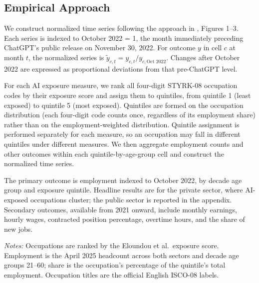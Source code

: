 \subsection{Empirical Approach}\label{sec:data:approach}

We construct normalized time series following the approach in \citet{brynjolfsson2025}, Figures 1--3. Each series is indexed to October 2022 = 1, the month immediately preceding ChatGPT's public release on November 30, 2022. For outcome $y$ in cell $c$ at month $t$, the normalized series is $\tilde{y}_{c,t} = y_{c,t} / y_{c,\text{Oct } 2022}$. Changes after October 2022 are expressed as proportional deviations from that pre-ChatGPT level.

For each AI exposure measure, we rank all four-digit STYRK-08 occupation codes by their exposure score and assign them to quintiles, from quintile 1 (least exposed) to quintile 5 (most exposed). Quintiles are formed on the occupation distribution (each four-digit code counts once, regardless of its employment share) rather than on the employment-weighted distribution. Quintile assignment is performed separately for each measure, so an occupation may fall in different quintiles under different measures. We then aggregate employment counts and other outcomes within each quintile-by-age-group cell and construct the normalized time series.

The primary outcome is employment indexed to October 2022, by decade age group and exposure quintile. Headline results are for the private sector, where AI-exposed occupations cluster; the public sector is reported in the appendix. Secondary outcomes, available from 2021 onward, include monthly earnings, hourly wages, contracted position percentage, overtime hours, and the share of new jobs.

\begin{table}[htbp]
\centering
\caption{Five largest occupations by AI-exposure quintile, April 2025.}
\label{tab:quintile_top_occ}
\footnotesize

\begin{minipage}{\textwidth}\footnotesize\textit{Notes:} Occupations are ranked by the Eloundou et al.\ exposure score. Employment is the April 2025 headcount across both sectors and decade age groups 21--60; share is the occupation's percentage of the quintile's total employment. Occupation titles are the official English ISCO-08 labels.\end{minipage}
\end{table}

